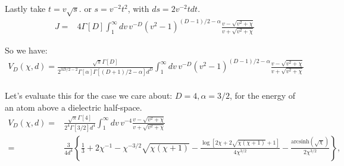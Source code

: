 Lastly take $t= v\sqrt{s}$.  or $s = v^{-2}t^2$, with $ds = 2v^{-2}t dt$.  
\begin{align}
J %
=& 4\Gamma[D]\int_{1}^\infty dv\,v^{-D}(v^2-1)^{(D-1)/2-\alpha}\frac{v-\sqrt{v^2+\chi}}{v+\sqrt{v^2+\chi  }}
\end{align}

So we have:
\begin{align}
V_D(\chi,d)=\frac{\sqrt{\pi}\Gamma[D]}{2^{3D/2-2}\Gamma[\alpha]\Gamma\left[(D+1)/2-\alpha\right]d^D}
\int_{1}^\infty dv\,v^{-D}(v^2-1)^{(D-1)/2-\alpha}\frac{v-\sqrt{v^2+\chi}}{v+\sqrt{v^2+\chi  }}\nonumber \\
\end{align}

Let's evaluate this for the case we care about: $D=4,\alpha=3/2$, 
for the energy of an atom above a dielectric half-space.
\begin{align}
V_D(\chi,d)=&\frac{\sqrt{\pi}\Gamma[4]}{2^{4}\Gamma[3/2]d^4}\int_{1}^\infty dv\,v^{-4}\frac{v-\sqrt{v^2+\chi}}{v+\sqrt{v^2+\chi  }}\nonumber \\
=&\frac{3}{4d^4}\left\{ \frac{1}{3}+2\chi^{-1}- \chi^{-3/2}\sqrt{\chi  (\chi +1)} 
-\frac{\log \left[2 \chi +2 \sqrt{\chi  (\chi+1)}+1\right]}{4 \chi^{3/2}}
-\frac{\text{arcsinh}\left(\sqrt{\chi }\right)}{2\chi^{3/2}}\right\},
\end{align}


